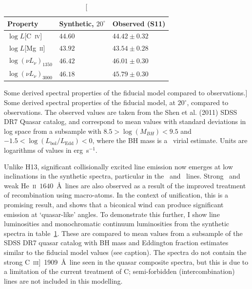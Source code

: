 \begin{table}
\centering
\begin{tabular}{p{2cm}p{2cm}p{3cm}}
\hline Property & Synthetic, $20^\circ$ & Observed  (S11) \\ 
\hline \hline
$\log L$[C~\textsc{iv}]  & $44.60$ & $44.42 \pm 0.32$  \\
$\log L$[Mg~\textsc{ii}] & $43.92$ & $43.54 \pm 0.28$  \\
$\log (\nu L_{\nu})_{1350}$  & $46.42$ & $46.01 \pm 0.30$ \\
$\log (\nu L_{\nu})_{3000}$  & $46.18$ & $45.79 \pm 0.30$ \\
\hline
\end{tabular}
\caption
[Some derived spectral properties of the fiducial model compared to observations.]
{
Some derived spectral properties of the fiducial model, at $20^\circ$,
compared to observations. The observed values are taken from the Shen et al. (2011)
SDSS DR7 Quasar catalog, and correspond to mean values with standard deviations in log space
from a subsample with $8.5>\log(M_{BH})<9.5$ and 
$-1.5<\log (L_{\mathrm{bol}}/L_{\mathrm{Edd}}) < 0$,
where the BH mass is a \civ\ virial estimate. 
Units are logarithms of values in erg~s$^{-1}$.
}
\label{line_lums}
\end{table}

Unlike H13, significant collisionally excited line emission now emerges
at low inclinations in the synthetic spectra, particular in the \civ\ and \nv\
lines. Strong \la\ and
weak He~\textsc{ii}~$1640$~\AA\ lines are also observed
as a result of the improved treatment of recombination using macro-atoms. 
In the context of unification, this is a promising result, 
and shows that a biconical wind can produce significant 
emission at `quasar-like' angles. To demonstrate this further,
I show line luminosities and monochromatic continuum luminosities
from the synthetic spectra in table~\ref{line_lums}. These are compared to
mean values from a subsample of the SDSS DR7 quasar catalog \citep{shen2011} 
with BH mass and Eddington fraction estimates similar to the fiducial model values 
(see caption). The spectra do not contain the strong 
C~\textsc{iii}]~1909~\AA\ line seen in the quasar composite spectra, 
but this is due to a limitation of the current treatment of C; semi-forbidden
(intercombination) lines are not included in this modelling.

